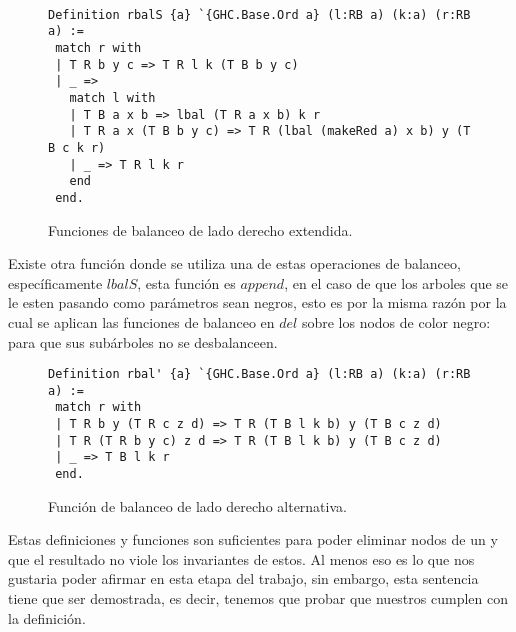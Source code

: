 \begin{figure}
\centering
\captionsetup{justification=centering}
\begin{verbatim}

Definition rbalS {a} `{GHC.Base.Ord a} (l:RB a) (k:a) (r:RB a) :=
 match r with
 | T R b y c => T R l k (T B b y c)
 | _ =>
   match l with
   | T B a x b => lbal (T R a x b) k r
   | T R a x (T B b y c) => T R (lbal (makeRed a) x b) y (T B c k r)
   | _ => T R l k r
   end
 end.

\end{verbatim}
\caption{Funciones de balanceo de lado derecho extendida.}
\label{rbalS}
\end{figure}

Existe otra función donde se utiliza una de estas operaciones de balanceo, específicamente $lbalS$,
esta funci\'on es $append$, en el caso de que los arboles que se le esten pasando como parámetros
sean negros, esto es por la misma razón por la cual se aplican las funciones de balanceo en $del$
sobre los nodos de color negro: para que sus subárboles no se desbalanceen.

\begin{figure}
\centering
\captionsetup{justification=centering}
\begin{verbatim}
Definition rbal' {a} `{GHC.Base.Ord a} (l:RB a) (k:a) (r:RB a) :=
 match r with
 | T R b y (T R c z d) => T R (T B l k b) y (T B c z d)
 | T R (T R b y c) z d => T R (T B l k b) y (T B c z d)
 | _ => T B l k r
 end.

\end{verbatim}
\caption{Funci\'on de balanceo de lado derecho alternativa.}
\label{rbal_2}
\end{figure}

Estas definiciones y funciones son suficientes para poder eliminar nodos de un {\arn} y que el
resultado no viole los invariantes de estos. Al menos eso es lo que nos gustaria poder afirmar en
esta etapa del trabajo, sin embargo, esta sentencia tiene que ser demostrada, es decir, tenemos que
probar que nuestros {\arns} cumplen con la definición.

